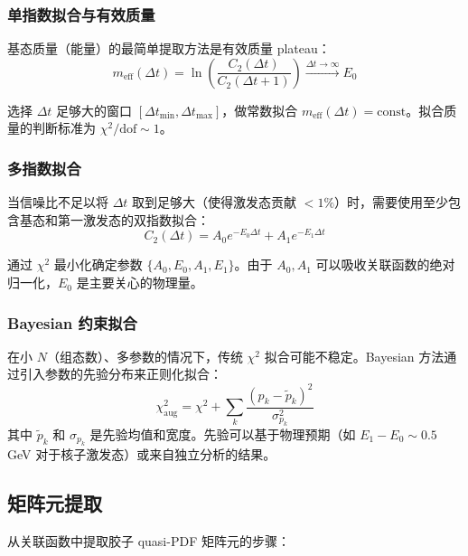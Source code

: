 \documentclass[11pt,a4paper]{ctexart}
\begin{document}
\subsubsection{单指数拟合与有效质量}

基态质量（能量）的最简单提取方法是有效质量 plateau：
\begin{equation}
m_{\text{eff}}(\Delta t) = \ln\!\left( \frac{C_2(\Delta t)}{C_2(\Delta t+1)} \right) \xrightarrow{\Delta t \to \infty} E_0
\end{equation}

选择 $\Delta t$ 足够大的窗口 $[\Delta t_{\text{min}}, \Delta t_{\text{max}}]$，做常数拟合 $m_{\text{eff}}(\Delta t) = \text{const}$。拟合质量的判断标准为 $\chi^2/\text{dof} \sim 1$。

\subsubsection{多指数拟合}

当信噪比不足以将 $\Delta t$ 取到足够大（使得激发态贡献 $<1\%$）时，需要使用至少包含基态和第一激发态的双指数拟合：
\begin{equation}
C_2(\Delta t) = A_0 e^{-E_0 \Delta t} + A_1 e^{-E_1 \Delta t}
\end{equation}

通过 $\chi^2$ 最小化确定参数 $\{A_0, E_0, A_1, E_1\}$。由于 $A_0, A_1$ 可以吸收关联函数的绝对归一化，$E_0$ 是主要关心的物理量。

\subsubsection{Bayesian 约束拟合}

在小 $N$（组态数）、多参数的情况下，传统 $\chi^2$ 拟合可能不稳定。Bayesian 方法通过引入参数的先验分布来正则化拟合：
\begin{equation}
\chi^2_{\text{aug}} = \chi^2 + \sum_k \frac{(p_k - \tilde{p}_k)^2}{\sigma_{p_k}^2}
\end{equation}
其中 $\tilde{p}_k$ 和 $\sigma_{p_k}$ 是先验均值和宽度。先验可以基于物理预期（如 $E_1 - E_0 \sim 0.5$ GeV 对于核子激发态）或来自独立分析的结果。

\subsection{矩阵元提取}

从关联函数中提取胶子 quasi-PDF 矩阵元的步骤：
\end{document}
